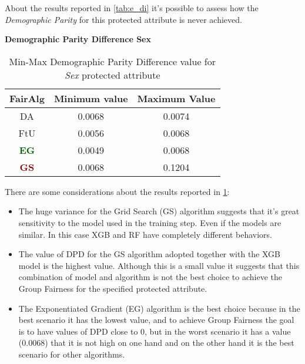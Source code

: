 About the results reported in \cref{tab:e_di} it's possible to assess how the \emph{Demographic Parity} for this protected attribute is never achieved.


\textbf{Demographic Parity Difference Sex}
\begin{table}[H]
    \centering
    \begin{tabular}{|c|c|c|}
        \hline
        \textbf{FairAlg} & \textbf{Minimum value} & \textbf{Maximum Value} \\
        \hline
        DA & 0.0068 & 0.0074 \\
        \hline
        FtU & 0.0056 & 0.0068 \\
        \hline
        \textcolor{darkgreen}{\textbf{EG}} & 0.0049 & 0.0068 \\
        \hline
        \textcolor{darkred}{\textbf{GS}} & 0.0068 & 0.1204 \\
        \hline
    \end{tabular}
    \caption{Min-Max Demographic Parity Difference value for \emph{Sex} protected attribute}
    \label{tab:s_dpd}
\end{table}

There are some considerations about the results reported in \cref{tab:s_dpd}:

\begin{itemize}
    \item The huge variance for the Grid Search (GS) algorithm suggests that it's great sensitivity to the model used in the training step. Even if the models are similar. In this case XGB and RF have completely different behaviors.

    \item The value of DPD for the GS algorithm adopted together with the XGB model is the highest value. Although this is a small value it suggests that this combination of model and algorithm is not the best choice to achieve the Group Fairness for the specified protected attribute.

    \item The Exponentiated Gradient (EG) algorithm is the best choice because in the best scenario it has the lowest value, and to achieve Group Fairness the goal is to have values of DPD close to 0, but in the worst scenario it has a value (0.0068) that it is not high on one hand and on the other hand it is the best scenario for other algorithms.

\end{itemize}


